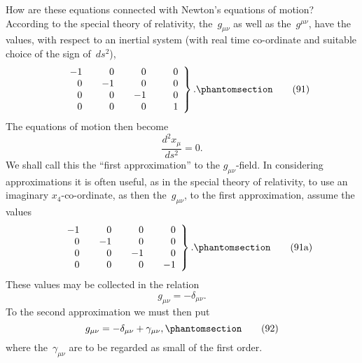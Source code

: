 \documentclass[12pt]{book}[2005/09/16]
\newcommand{\Change}[2]{#2}
\newcommand{\Add}[1]{\Change{}{#1}}
\newcommand{\PageSep}[1]{\ignorespaces}
\newcommand{\Tag}[1]{%
  \phantomsection
  \label{eqn:#1}
  \tag*{#1}
}
\newcommand{\Neg}[1][{\,}]{\phantom{#1-#1}}
\begin{document}
How are these equations connected with Newton's
equations of motion? According to the special theory
of relativity, the~$g_{\mu\nu}$ as well as the~$g^{\mu\nu}$, have the values,
with respect to an inertial system (with real time co-ordinate
and suitable choice of the sign of~$ds^{2}$),
\[
\left.
\begin{array}{*{4}{>{\quad}r}}
-1 & 0 & 0 & 0 \\
0 & -1 & 0 & 0 \\
0 & 0 & -1 & 0 \\
0 & 0 & 0  & \Neg[]1
\end{array}
\right\}\Add{.}
\Tag{(91)}
\]
The equations of motion then become
\[
\frac{d^{2} x_{\mu}}{ds^{2}} = 0.
\]
We shall call this the ``first approximation'' to the $g_{\mu\nu}$-field.
In considering approximations it is often useful,
as in the special theory of relativity, to use an imaginary
$x_{4}$-co-ordinate, as then the~$g_{\mu\nu}$, to the first approximation,
assume the values
\[
\left.
\begin{array}{*{4}{>{\quad}r}}
-1 & 0 & 0 & 0 \\
0 & -1 & 0 & 0 \\
0 & 0 & -1 & 0 \\
0 & 0 & 0 & -1
\end{array}
\right\}\Add{.}
\Tag{(91a)}
\]
These values may be collected in the relation
\[
g_{\mu\nu} = -\delta_{\mu\nu}.
\]
To the second approximation we must then put
\[
g_{\mu\nu} = -\delta_{\mu\nu} + \gamma_{\mu\nu}\Add{,}
\Tag{(92)}
\]
\PageSep{89}
where the~$\gamma_{\mu\nu}$ are to be regarded as small of the first
order.
\end{document}
